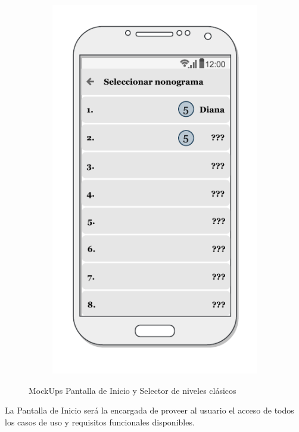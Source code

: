 \begin{figure}[H]
\begin{subfigure}[b]{0.38\linewidth}
      \includegraphics[width=\linewidth]{images/screen2.pdf}
    \end{subfigure}
    \caption{MockUps Pantalla de Inicio y Selector de niveles clásicos}
    \label{fig:design-1}
\end{figure}

La Pantalla de Inicio será la encargada de proveer al usuario el acceso de todos los casos
de uso y requisitos funcionales disponibles.

